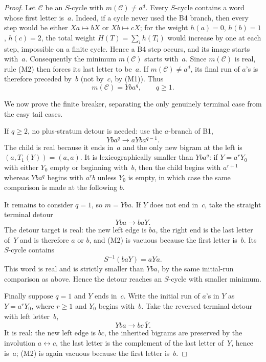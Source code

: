 \documentclass{amsart}
\theoremstyle{definition}
\theoremstyle{remark}
\begin{document}
\begin{proof}
Let $\mathcal C$ be an $S$-cycle with $m(\mathcal C)\ne a^d$.  Every
$S$-cycle contains a word whose first letter is~$a$.  Indeed, if a
cycle never used the B4 branch, then every step would be either
$Xa\mapsto bX$ or $Xb\mapsto cX$; for the weight
$h(a)=0$, $h(b)=1$, $h(c)=2$, the total weight
$H(T)=\sum_i h(T_i)$ would increase by one at each step, impossible on
a finite cycle.  Hence a B4 step occurs, and its image starts with~$a$.
Consequently the minimum $m(\mathcal C)$ starts with~$a$.  Since
$m(\mathcal C)$ is real, rule \textup{(M2)} then forces its last letter
to be~$a$.  If $m(\mathcal C)\ne a^d$, its final run of $a$'s is
therefore preceded by~$b$ (not by~$c$, by \textup{(M1)}).  Thus
\[
  m(\mathcal C)=Yba^q,\qquad q\ge1 .
\]

We now prove the finite breaker, separating the only genuinely
terminal case from the easy tail cases.

If $q\ge2$, no plus-stratum detour is needed: use the $a$-branch of
B1,
\[
  Yba^q \longrightarrow aYba^{q-1}.
\]
The child is real because it ends in~$a$ and the only new bigram at the
left is $(a,T_1(Y))=(a,a)$.  It is lexicographically smaller than
$Yba^q$: if $Y=a^rY_0$ with either $Y_0$ empty or beginning with~$b$,
then the child begins with $a^{r+1}$ whereas $Yba^q$ begins with
$a^r b$ unless $Y_0$ is empty, in which case the same comparison is
made at the following $b$.

It remains to consider $q=1$, so $m=Yba$.  If $Y$ does not end in~$c$,
take the straight terminal detour
\[
  Yba \longrightarrow baY .
\]
The detour target is real: the new left edge is $ba$, the right end is
the last letter of~$Y$ and is therefore $a$ or $b$, and \textup{(M2)}
is vacuous because the first letter is~$b$.  Its $S$-cycle contains
\[
  S^{-1}(baY)=aYa .
\]
This word is real and is strictly smaller than $Yba$, by the same
initial-run comparison as above.  Hence the detour reaches an
$S$-cycle with smaller minimum.

Finally suppose $q=1$ and $Y$ ends in~$c$.  Write the initial run of
$a$'s in $Y$ as $Y=a^rY_0$, where $r\ge1$ and $Y_0$ begins with~$b$.
Take the reversed terminal detour with left letter~$b$,
\[
  Yba \longrightarrow bc\,\bar Y .                    \tag{**}
\]
It is real: the new left edge is $bc$, the inherited bigrams are
preserved by the involution $a\leftrightarrow c$, the last letter is
the complement of the last letter of~$Y$, hence is~$a$; \textup{(M2)}
is again vacuous because the first letter is~$b$.


\end{proof}
\end{document}
